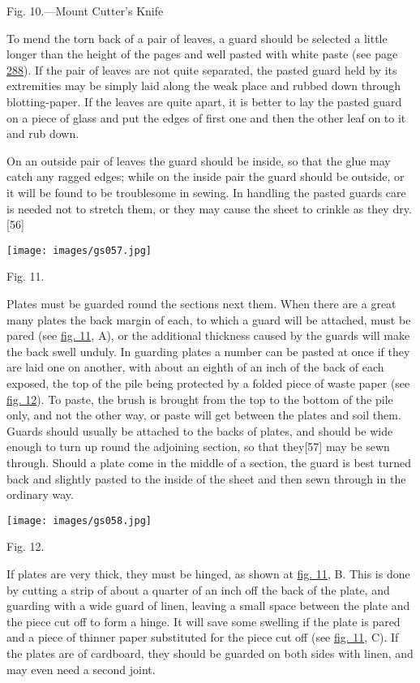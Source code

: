 \documentclass[
]{article}
\begin{document}
Fig. 10.---Mount Cutter's Knife

To mend the torn back of a pair of leaves, a guard should be selected a
little longer than the height of the pages and well pasted with white
paste (see page \protect\hyperlink{Page_288}{288}). If the pair of
leaves are not quite separated, the pasted guard held by its extremities
may be simply laid along the weak place and rubbed down through
blotting-paper. If the leaves are quite apart, it is better to lay the
pasted guard on a piece of glass and put the edges of first one and then
the other leaf on to it and rub down.

On an outside pair of leaves the guard should be inside, so that the
glue may catch any ragged edges; while on the inside pair the guard
should be outside, or it will be found to be troublesome in sewing. In
handling the pasted guards care is needed not to stretch them, or they
may cause the sheet to crinkle as they
dry.{\protect\hypertarget{Page_56}{}{{[}56{]}}}

\protect\hypertarget{Fig_11}{}{}
\texttt{[image: images/gs057.jpg]}

Fig. 11.

Plates must be guarded round the sections next them. When there are a
great many plates the back margin of each, to which a guard will be
attached, must be pared (see \protect\hyperlink{Fig_11}{fig. 11}, A), or
the additional thickness caused by the guards will make the back swell
unduly. In guarding plates a number can be pasted at once if they are
laid one on another, with about an eighth of an inch of the back of each
exposed, the top of the pile being protected by a folded piece of waste
paper (see \protect\hyperlink{Fig_12}{fig. 12}). To paste, the brush is
brought from the top to the bottom of the pile only, and not the other
way, or paste will get between the plates and soil them. Guards should
usually be attached to the backs of plates, and should be wide enough to
turn up round the adjoining section, so that
they{\protect\hypertarget{Page_57}{}{{[}57{]}}} may be sewn through.
Should a plate come in the middle of a section, the guard is best turned
back and slightly pasted to the inside of the sheet and then sewn
through in the ordinary way.

\protect\hypertarget{Fig_12}{}{}
\texttt{[image: images/gs058.jpg]}

Fig. 12.

If plates are very thick, they must be hinged, as shown at
\protect\hyperlink{Fig_11}{fig. 11}, B. This is done by cutting a strip
of about a quarter of an inch off the back of the plate, and guarding
with a wide guard of linen, leaving a small space between the plate and
the piece cut off to form a hinge. It will save some swelling if the
plate is pared and a piece of thinner paper substituted for the piece
cut off (see \protect\hyperlink{Fig_11}{fig. 11}, C). If the plates are
of cardboard, they should be guarded on both sides with linen, and may
even need a second joint.
\end{document}
